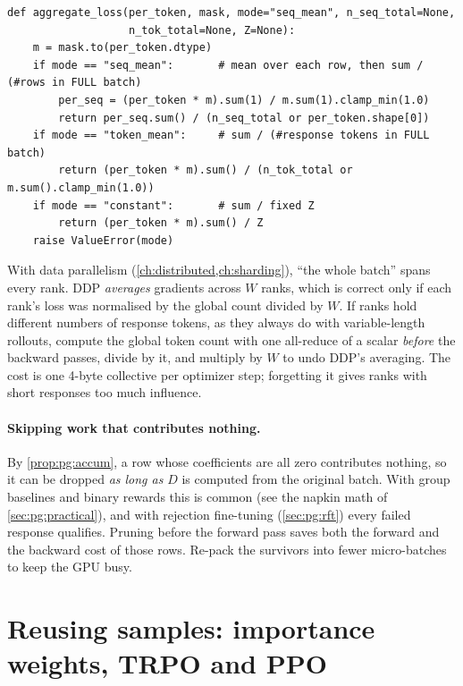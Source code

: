 \begin{lstlisting}[caption={Aggregation that is exact under accumulation (\code{llmsys.pg.aggregate\_loss}).},label={lst:pg:aggregate}]
def aggregate_loss(per_token, mask, mode="seq_mean", n_seq_total=None,
                   n_tok_total=None, Z=None):
    m = mask.to(per_token.dtype)
    if mode == "seq_mean":       # mean over each row, then sum / (#rows in FULL batch)
        per_seq = (per_token * m).sum(1) / m.sum(1).clamp_min(1.0)
        return per_seq.sum() / (n_seq_total or per_token.shape[0])
    if mode == "token_mean":     # sum / (#response tokens in FULL batch)
        return (per_token * m).sum() / (n_tok_total or m.sum().clamp_min(1.0))
    if mode == "constant":       # sum / fixed Z
        return (per_token * m).sum() / Z
    raise ValueError(mode)
\end{lstlisting}

\begin{systemslens}
With data parallelism (\cref{ch:distributed,ch:sharding}), ``the whole batch'' spans every rank.
DDP \emph{averages} gradients across $W$ ranks, which is correct only if each rank's loss was
normalised by the global count divided by $W$. If ranks hold different numbers of response
tokens, as they always do with variable-length rollouts, compute the global token count with
one all-reduce of a scalar \emph{before} the backward passes, divide by it, and multiply by
$W$ to undo DDP's averaging. The cost is one 4-byte collective per optimizer step; forgetting
it gives ranks with short responses too much influence.
\end{systemslens}

\paragraph{Skipping work that contributes nothing.} By \cref{prop:pg:accum}, a row whose
coefficients are all zero contributes nothing, so it can be dropped \emph{as long as} $D$
is computed from the original batch. With group baselines and binary rewards this is
common (see the napkin math of \cref{sec:pg:practical}), and with rejection fine-tuning
(\cref{sec:pg:rft}) every failed response qualifies. Pruning before the forward pass saves
both the forward and the backward cost of those rows. Re-pack the survivors into fewer
micro-batches to keep the GPU busy.

\section{Reusing samples: importance weights, TRPO and PPO}\label{sec:pg:offpolicy}

